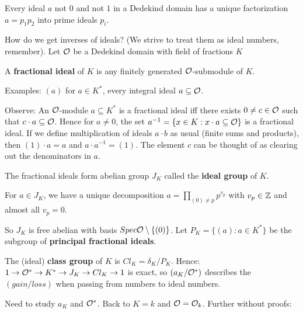 \begin{outline}
\0 \begin{theorem}
    Every ideal $a$ not $0$ and not $1$ in a Dedekind domain has a unique factorization $a=p_1 p_2$ into prime ideals $p_i$. 
\end{theorem}

How do we get inverses of ideals? (We strive to treat them as ideal numbers, remember). Let $\mathcal{O}$ be a Dedekind domain with field of fractions $K$

\0 \begin{definition}
    A \textbf{fractional ideal} of $K$ is any finitely generated $\mathcal{O}$-submodule of $K$.
\end{definition}

\1 Examples: $(a)$ for $a\in K^*$, every integral ideal $a\subseteq \mathcal{O}$.

\1 Observe: An $\mathcal{O}$-module $a\subseteq K^*$ is a fractional ideal iff there exists $0\neq c \in \mathcal{O}$ such that $c\cdot a \subseteq \mathcal{O}$. Hence for $a\neq 0$, the set $a^{-1}=\{x\in K : x\cdot a \subseteq \mathcal{O}\}$ is a fractional ideal. If we define multiplication of ideals $a\cdot b$ as usual (finite sums and products), then $(1) \cdot a = a$ and $a\cdot a^{-1}=(1)$. The element $c$ can be thought of as clearing out the denominators in $a$.

\0 \begin{definition}
    The fractional ideals form abelian group $J_K$ called the \textbf{ideal group} of $K$.
\end{definition}

\0 \begin{corollary}
    For $a \in J_K$, we have a unique decomposition $a = \prod_{(0)\neq p}p^{v_p}$ with $v_p \in \mathbb{Z}$ and almost all $v_p = 0$.
\end{corollary}

\1 So $J_K$ is free abelian with basis $Spec \mathcal{O} \setminus \{(0)\}$. Let $P_K = \{(a) : a \in K^*\}$ be the subgroup of \textbf{principal fractional ideals}.

\0 \begin{definition}
    The (ideal) \textbf{class group} of $K$ is $Cl_K=\delta_K / P_K$. Hence: 
    $1 \rightarrow \mathcal{O}^* \rightarrow K^* \rightarrow J_K \rightarrow Cl_K \rightarrow 1$ is exact, so $(a_K / \mathcal{O}^*)$ describes the $(gain/loss)$ when passing from numbers to ideal numbers.
\end{definition}

\1 Need to study $a_K$ and $\mathcal{O}^*$. Back to $K=k$ and $\mathcal{O} = \mathcal{O}_k$. Further without proofs:


\end{outline}
